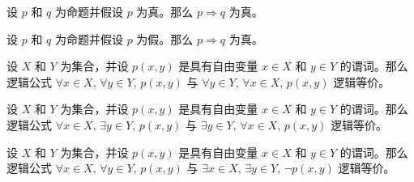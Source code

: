 
\begin{chapex} %
\label{cqLogicASNBegin}
设 $p$ 和 $q$ 为命题并假设 $p$ 为真。那么 $p \Rightarrow q$ 为真。
\end{chapex}

\begin{chapex} %
设 $p$ 和 $q$ 为命题并假设 $p$ 为假。那么 $p \Rightarrow q$ 为真。
\end{chapex}

\begin{chapex} %
设 $X$ 和 $Y$ 为集合，并设 $p(x,y)$ 是具有自由变量 $x \in X$ 和 $y \in Y$ 的谓词。那么逻辑公式 $\forall x \in X,\, \forall y \in Y,\, p(x,y)$ 与 $\forall y \in Y,\, \forall x \in X,\, p(x,y)$ 逻辑等价。
\end{chapex}

\begin{chapex} %
设 $X$ 和 $Y$ 为集合，并设 $p(x,y)$ 是具有自由变量 $x \in X$ 和 $y \in Y$ 的谓词。那么逻辑公式 $\forall x \in X,\, \exists y \in Y,\, p(x,y)$ 与 $\exists y \in Y,\, \forall x \in X,\, p(x,y)$ 逻辑等价。
\end{chapex}

\begin{chapex} %
\label{cqLogicASNEnd}
设 $X$ 和 $Y$ 为集合，并设 $p(x,y)$ 是具有自由变量 $x \in X$ 和 $y \in Y$ 的谓词。那么逻辑公式 $\forall x \in X,\, \forall y \in Y,\, p(x,y)$ 与 $\exists x \in X,\, \exists y \in Y,\, \neg p(x,y)$ 逻辑等价。
\end{chapex}
